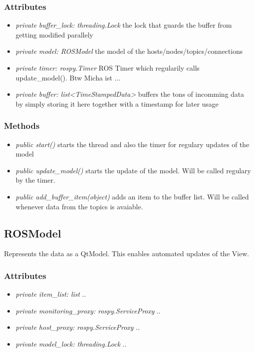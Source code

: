 \subsubsection{Attributes}
\begin{itemize}
  \item \textit{private buffer\_lock: threading.Lock} the lock that guards the buffer from getting modified parallely
  \item \textit{private model: ROSModel} the model of the hosts/nodes/topics/connections 
  \item \textit{private timer: rospy.Timer} ROS Timer which regularily calls update\_model(). Btw Micha ist ...
  \item \textit{private buffer: list<TimeStampedData>} buffers the tons of incomming data by simply storing it here together with a timestamp for later usage
\end{itemize}
\subsubsection{Methods}
\begin{itemize}
  \item \textit{public start()} starts the thread and also the timer for regulary updates of the model
  \item \textit{public update\_model()} starts the update of the model. Will be called regulary by the timer.
  \item \textit{public add\_buffer\_item(object)} adds an item to the buffer list. Will be called whenever data from the topics is avaiable.
\end{itemize}

\subsection{ROSModel}
Represents the data as a QtModel. This enables automated updates of the View.
\subsubsection{Attributes}
\begin{itemize}
  \item \textit{private item\_list: list}
  ..
  \item \textit{private monitoring\_proxy: rospy.ServiceProxy}
  ..
  \item \textit{private host\_proxy: rospy.ServiceProxy}
  ..  
  \item \textit{private model\_lock: threading.Lock}
  ..
\end{itemize}
